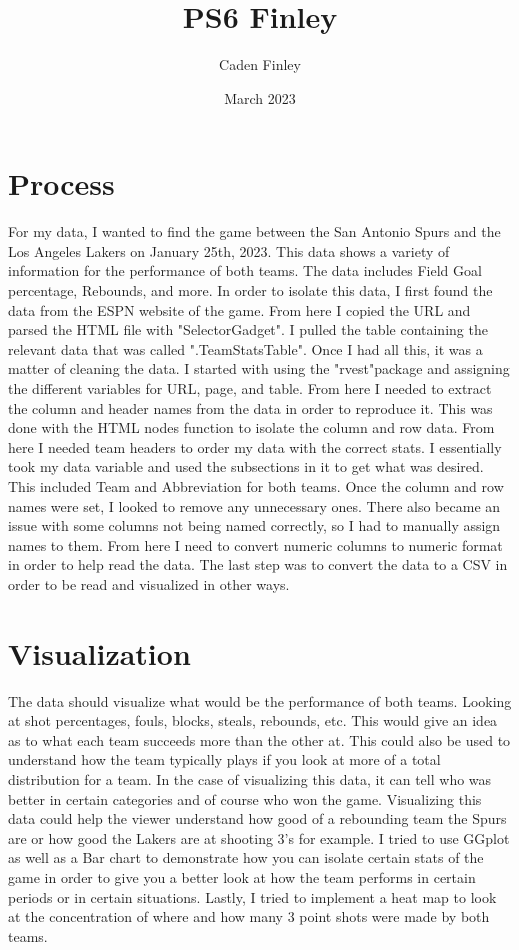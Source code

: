 \documentclass{article}
\title{PS6 Finley}
\author{Caden Finley}
\date{March 2023}
\begin{document}
\maketitle

\section{Process}

For my data, I wanted to find the game between the San Antonio Spurs and the Los Angeles Lakers on January 25th, 2023. This data shows a variety of information for the performance of both teams. The data includes Field Goal percentage, Rebounds, and more. In order to isolate this data, I first found the data from the ESPN website of the game. From here I copied the URL and parsed the HTML file with "SelectorGadget". I pulled the table containing the relevant data that was called ".TeamStatsTable". Once I had all this, it was a matter of cleaning the data. I started with using the "rvest"package and assigning the different variables for URL, page, and table. From here I needed to extract the column and header names from the data in order to reproduce it. This was done with the HTML nodes function to isolate the column and row data. From here I needed team headers to order my data with the correct stats. I essentially took my data variable and used the subsections in it to get what was desired. This included Team and Abbreviation for both teams. Once the column and row names were set, I looked to remove any unnecessary ones. There also became an issue with some columns not being named correctly, so I had to manually assign names to them. From here I need to convert numeric columns to numeric format in order to help read the data. The last step was to convert the data to a CSV in order to be read and visualized in other ways. 

\section{Visualization}

The data should visualize what would be the performance of both teams. Looking at shot percentages, fouls, blocks, steals, rebounds, etc. This would give an idea as to what each team succeeds more than the other at. This could also be used to understand how the team typically plays if you look at more of a total distribution for a team. In the case of visualizing this data, it can tell who was better in certain categories and of course who won the game. Visualizing this data could help the viewer understand how good of a rebounding team the Spurs are or how good the Lakers are at shooting 3's for example. I tried to use GGplot as well as a Bar chart to demonstrate how you can isolate certain stats of the game in order to give you a better look at how the team performs in certain periods or in certain situations. Lastly, I tried to implement a heat map to look at the concentration of where and how many 3 point shots were made by both teams. 
\end{document}
